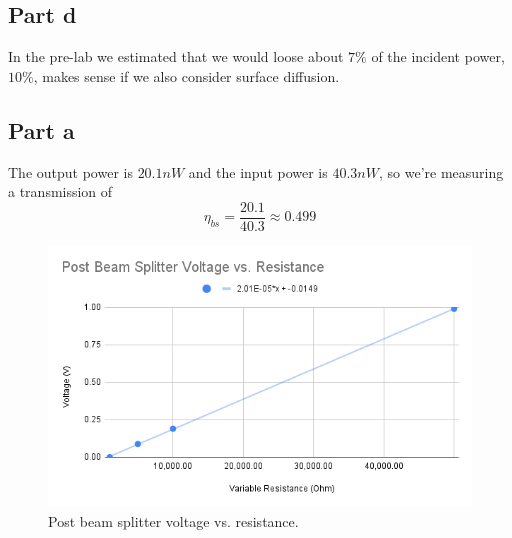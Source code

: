 \subsection*{Part d}
In the pre-lab we estimated that we would loose about $7\%$ of the incident power, $10\%$, makes sense if we also consider surface diffusion.

\pagebreak
{}

\subsection*{Part a}
The output power is $20.1nW$ and the input power is $40.3nW$, so we're measuring a transmission of
$$
\eta_{bs} = \frac{20.1}{40.3} \approx 0.499
$$

\begin{figure}[h]
    \centering
    \includegraphics[width=0.75\linewidth]{Resources//180Q//Homework 2/Post Beam Splitter Voltage vs. Resistance.png}
    \caption{Post beam splitter voltage vs. resistance.}
    \label{fig:enter-label}
\end{figure}
